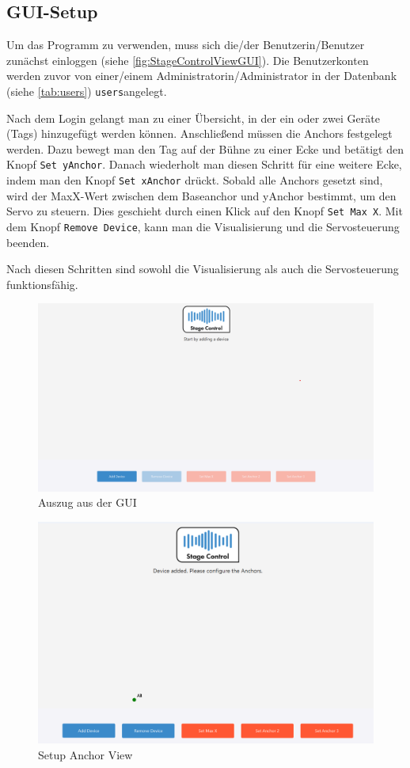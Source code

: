 \subsection{GUI-Setup}
Um das Programm zu verwenden, muss sich die/der Benutzerin/Benutzer zunächst einloggen (siehe \ref{fig:StageControlViewGUI}). Die Benutzerkonten werden zuvor von einer/einem Administratorin/Administrator in der Datenbank (siehe \ref{tab:users}) \texttt{users}angelegt.  

Nach dem Login gelangt man zu einer Übersicht, in der ein oder zwei Geräte (Tags) hinzugefügt werden können. Anschließend müssen die Anchors festgelegt werden. Dazu bewegt man den Tag auf der Bühne zu einer Ecke und betätigt den Knopf \texttt{Set yAnchor}. Danach wiederholt man diesen Schritt für eine weitere Ecke, indem man den Knopf \texttt{Set xAnchor} drückt. Sobald alle Anchors gesetzt sind, wird der MaxX-Wert zwischen dem Baseanchor und yAnchor bestimmt, um den Servo zu steuern. Dies geschieht durch einen Klick auf den Knopf \texttt{Set Max X}. Mit dem Knopf \texttt{Remove Device}, kann man die Visualisierung und die Servosteuerung beenden.   

Nach diesen Schritten sind sowohl die Visualisierung als auch die Servosteuerung funktionsfähig.

\begin{figure}[H]
	\centering
	\includegraphics[width=0.9\linewidth]{images/stagecontrol-overview.png}
	\caption[Auszug aus der GUI]{Auszug aus der GUI}
	\label{fig:StageControlOverview}
\end{figure}

\begin{figure}[H]
	\centering
	\includegraphics[width=0.9\linewidth]{images/stagecontrol-setupanchor.png}
	\caption[Setup Anchor View]{Setup Anchor View}
	\label{fig:StageControlSetupAnchor}
\end{figure}

